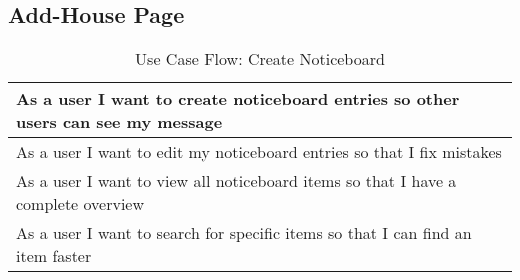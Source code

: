 \subsection{Add-House Page}
\begin{table}[H]
  \begin{tabularx}{\linewidth}{|X|}
    \hline
      As a user I want to create noticeboard entries so other users can see my message \\
     \hline
      As a user I want to edit my noticeboard entries so that I fix mistakes \\
     \hline
      As a user I want to view all noticeboard items so that I have a complete overview \\
     \hline
      As a user I want to search for specific items so that I can find an item faster \\
     \hline 
  \end{tabularx}
  \caption{Use Case Flow: Create Noticeboard}
\end{table}

